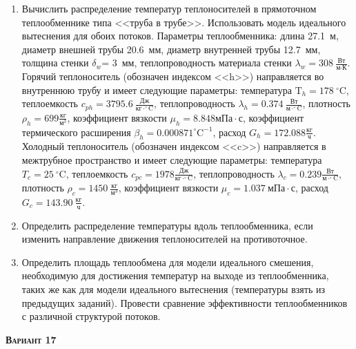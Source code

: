 \begin{enumerate} 
\item Вычислить распределение температур теплоносителей в прямоточном теплообменнике типа <<труба в трубе>>. Использовать модель идеального вытеснения для обоих потоков. Параметры теплообменника: длина  27.1~м, диаметр внешней трубы 20.6~мм,  диаметр внутренней трубы 12.7~мм, толщина стенки $\delta_{w}$=     3~мм,  теплопроводность материала стенки $\lambda_{w}=  308~\frac{\text{Вт}}{\text{м} \cdot \text{К}}$.  Горячий теплоноситель (обозначен индексом <<h>>) направляется во внутреннюю трубу и	 имеет следующие параметры: температура $\text{T}_{h}= 178~^\circ\mathrm{C}$, теплоемкость	  $c_{p{h}}= 3795.6~\frac{\text{Дж}}{\text{кг} \cdot ^\circ\mathrm{C}}$, теплопроводность 		$\lambda_{h}= 0.374~\frac{\text{Вт}}{\text{м} \cdot ^\circ\mathrm{C}}$, плотность 		$\rho_{h}=  699 \frac{\text{кг}}{\text{м}^3}$, коэффициент вязкости $\mu_{h}=8.848 \text{мПа} 		\cdot \text{с} $, коэффициент термического расширения $\beta_{h}=0.000871 ^\circ\mathrm{C}^{-1}$,		 расход $G_{h}= 172.088 \frac{\text{кг}}{\text{ч}}$. Холодный теплоноситель (обозначен индексом <<c>>) 		 направляется в межтрубное пространство и имеет следующие параметры: температура $T_{c}=   25		 ~^\circ\mathrm{C}$, теплоемкость $c_{p{c}}= 1978 \frac{\text{Дж}}{\text{кг} \cdot ^\circ\mathrm{C}}$,			 теплопроводность $\lambda_{c}=0.239 \frac{\text{Вт}}{\text{м} \cdot ^\circ\mathrm{C}}$, плотность 			 $\rho_{c}=  1450~\frac{\text{кг}}{\text{м}^3}$, коэффициент вязкости $\mu_{c}=1.037~\text{мПа} \cdot \text{с} $, 			 расход $G_{c}=143.90~\frac{\text{кг}}{\text{ч}}$. 

\item Определить распределение температуры вдоль теплообменника, если 	изменить направление движения теплоносителей на противоточное.

\item Определить площадь теплообмена для модели идеального смешения, необходимую для достижения 	температур на выходе из теплообменника, таких же как для модели идеального вытеснения (температуры взять из предыдущих заданий).	Провести сравнение эффективности теплообменников с различной структурой потоков.

\end{enumerate}

\textsc{\textbf{Вариант 17}}

